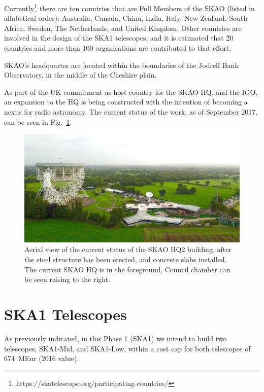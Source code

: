 \documentclass[a4paper,
               biblatex,       %
               keeplastbox,    %
               ]{jacow-2_1}    %
\begin{document}
Currently\footnote{https://skatelescope.org/participating-countries/} there are ten countries that are Full Members of the SKAO (listed in alfabetical order): Australia, Canada, China, India, Italy, New Zealand, South Africa, Sweden, The Netherlands, and United Kingdom. Other countries are involved in the design of the SKA1 telescopes, and it is estimated that \~20 countries and more than 100 organisations are contributed to that effort.

SKAO's headquartes are located within the boundaries of the Jodrell Bank Observatory, in the middle of the Cheshire plain.

As part of the UK commitment as host country for the SKAO HQ, and the IGO, an expansion to the HQ is being constructed with the intention of becoming a nexus for radio astronomy. The current status of the work, as of September 2017, can be seen in Fig.~\ref{fig:SKA-HQ2-aerial}.

\begin{figure}[!tb]
  \centering
    \includegraphics[width=\columnwidth]{figs/SKA-HQ2-aerial}
  \caption{Aerial view of the current status of the SKAO HQ2 building, after the steel structure has been erected, and concrete slabs installed. The current SKAO HQ is in the foreground, Council chamber can be seen raising to the right.}
  \label{fig:SKA-HQ2-aerial}
\end{figure}


\section{SKA1 Telescopes} %
\label{sec:ska1_telescopes}

As previously indicated, in this Phase 1 (SKA1) we intend to build two telescopes, SKA1-Mid, and SKA1-Low, within a cost cap for both telescopes of 674~MEur (2016 value).
\end{document}
